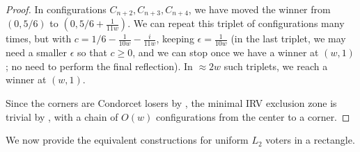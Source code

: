 \documentclass{article}
\theoremstyle{theorem}
\theoremstyle{definition}
\begin{document}
\begin{proof}
  In configurations $C_{n+2}, C_{n+3}, C_{n+4}$, we have moved the winner from $(0, 5/6)$ to $(0, 5/6 + \frac{1}{11w})$. We can repeat this triplet of configurations many times, but with $c = 1/6 - \frac{1}{10w} - \frac{i}{11w}$, keeping $\epsilon = \frac{1}{10w}$ (in the last triplet, we may need a smaller $\epsilon$ so that $c \ge 0$, and we can stop once we have a winner at $(w, 1)$; no need to perform the final reflection). In $\approx 2 w$ such triplets, we reach a winner at $(w, 1)$. 
  
  Since the corners are Condorcet losers by , the minimal IRV exclusion zone is trivial by , with a chain of $O(w)$ configurations from the center to a corner.
  
\end{proof}

We now provide the equivalent constructions for uniform $L_2$ voters in a rectangle.
\end{document}
